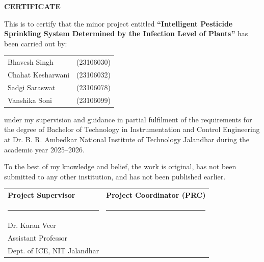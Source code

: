 \documentclass[12pt,a4paper,oneside]{report}
\begin{document}
\setcounter{page}{1}
\pagestyle{plain}

\newpage
{}
{}
\begin{center}
{\Large \textbf{CERTIFICATE}}
\end{center}
\vspace{1cm}

\noindent This is to certify that the minor project entitled \textbf{``Intelligent Pesticide Sprinkling System Determined by the Infection Level of Plants''} has been carried out by:

\vspace{0.5cm}
\begin{center}
\begin{tabular}{ll}
Bhavesh Singh      & (23106030) \\
Chahat Kesharwani  & (23106032) \\
Sadgi Saraswat     & (23106078) \\
Vanshika Soni      & (23106099) \\
\end{tabular}
\end{center}
\vspace{0.5cm}

\noindent under my supervision and guidance in partial fulfilment of the requirements for the degree of Bachelor of Technology in Instrumentation and Control Engineering at Dr. B. R. Ambedkar National Institute of Technology Jalandhar during the academic year 2025--2026.

\noindent To the best of my knowledge and belief, the work is original, has not been submitted to any other institution, and has not been published earlier.

\vspace{2.5cm}
\noindent
\begin{tabular}{p{}p{}}
\textbf{Project Supervisor} & \textbf{Project Coordinator (PRC)} \\[1.5cm]
\rule{5cm}{0.4pt} & \rule{5cm}{0.4pt} \\
Dr. Karan Veer & \\
Assistant Professor & \\
Dept. of ICE, NIT Jalandhar & \\
\end{tabular}
\end{document}
